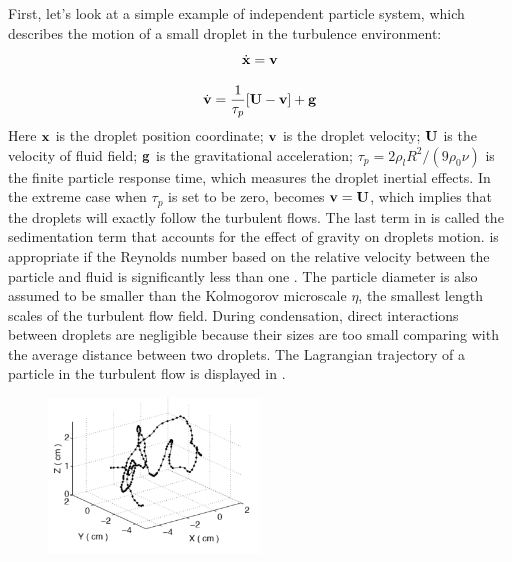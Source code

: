 First, let's look at a simple example of independent particle system, which describes the motion of a small droplet in the turbulence environment:
\begin{equation}
\dot{\mathbf{x}}=\mathbf{v}\label{droplet_x_eqn}
\end{equation}

\begin{equation}
\dot{\mathbf{v}}=\frac{1}{\tau_{p}}[\mathbf{U}-\mathbf{v}]+\mathbf{g}\label{droplet_v_eqn}
\end{equation}
Here $\mathbf{x}$ is the droplet position coordinate; 
$\mathbf{v}$ is the droplet velocity; $\mathbf{U}$ is the velocity of fluid field;
$\mathbf{g}$ is the gravitational acceleration; $\tau_{p}=2\rho_{l}R^{2}/(9\rho_{0}\nu)$ is the finite particle response time, which measures the droplet inertial
effects. In the extreme case when $\tau_{p}$ is set to be zero, 
becomes $\mathbf{v}=\mathbf{U}$, which implies that the
droplets will exactly follow the turbulent flows. The last term in  is called the sedimentation term that accounts for the effect of
gravity on droplets motion.  is appropriate if the
Reynolds number based on the relative velocity between the particle and fluid
is significantly less than one \cite{Eaton94}. The particle diameter is also
assumed to be smaller than the Kolmogorov microscale $\eta$, the smallest
length scales of the turbulent flow field. During condensation, direct
interactions between droplets are negligible because their sizes are too small
comparing with the average distance between two droplets. The Lagrangian trajectory of a particle in the turbulent flow is displayed in .
\begin{figure}
\centering
\includegraphics[width=0.5\textwidth]{Figures/Lagrangian_trajectory.png}
\label{lag_traj}
\end{figure}

